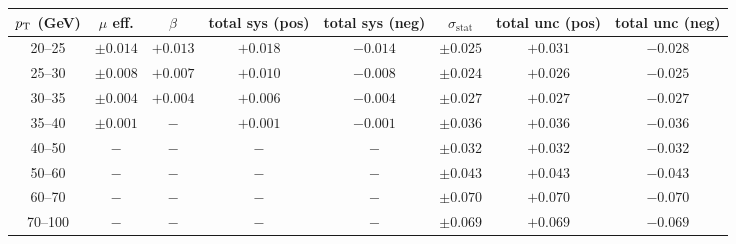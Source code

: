 \begin{tabular}{c|cc|cc|c|cc}
$p_\text{T}$ (GeV)  & $\mu$ eff. & $\beta$ & total sys (pos) & total sys (neg) & $\sigma_{\text{stat}}$ & total unc (pos) & total unc (neg) \\
\hline
20--25 & $\pm0.014$ & $+0.013$ & $+0.018$ & $-0.014$ & $\pm0.025$ & $+0.031$ & $-0.028$\\
25--30 & $\pm0.008$ & $+0.007$ & $+0.010$ & $-0.008$ & $\pm0.024$ & $+0.026$ & $-0.025$\\
30--35 & $\pm0.004$ & $+0.004$ & $+0.006$ & $-0.004$ & $\pm0.027$ & $+0.027$ & $-0.027$\\
35--40 & $\pm0.001$ & $-$ & $+0.001$ & $-0.001$ & $\pm0.036$ & $+0.036$ & $-0.036$\\
40--50 & $-$ & $-$ & $-$ & $-$ & $\pm0.032$ & $+0.032$ & $-0.032$\\
50--60 & $-$ & $-$ & $-$ & $-$ & $\pm0.043$ & $+0.043$ & $-0.043$\\
60--70 & $-$ & $-$ & $-$ & $-$ & $\pm0.070$ & $+0.070$ & $-0.070$\\
70--100 & $-$ & $-$ & $-$ & $-$ & $\pm0.069$ & $+0.069$ & $-0.069$\\
\end{tabular}
